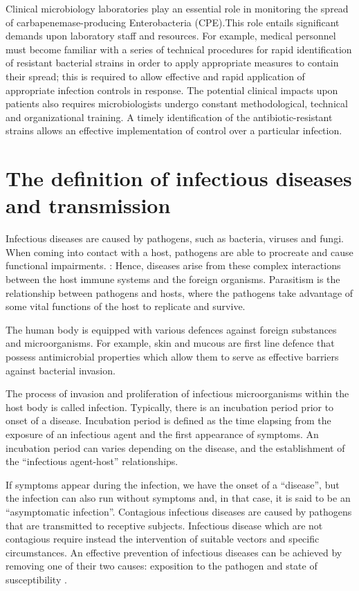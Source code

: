 \documentclass[11pt]{report}
\begin{document}
Clinical microbiology laboratories play an essential role in monitoring the spread of carbapenemase-producing Enterobacteria (CPE).This role entails significant demands upon laboratory staff and resources. For example, medical personnel must become familiar with a series of technical procedures for rapid identification of resistant bacterial strains in order to apply appropriate measures to contain their spread; this is required to allow effective and rapid application of appropriate infection controls in response. The potential clinical impacts upon patients also requires microbiologists undergo constant methodological, technical and organizational training. A timely identification of the antibiotic-resistant strains allows an effective implementation of control over a particular infection.

\section{The definition of infectious diseases and transmission}
Infectious diseases are caused by pathogens, such as bacteria, viruses and fungi. When coming into contact with a host, pathogens are able to procreate and cause functional impairments. :  Hence,  diseases arise from these complex interactions between the host immune systems and the foreign organisms. Parasitism is the relationship between pathogens and hosts, where the pathogens take advantage of some vital functions of the host to replicate and survive. 

The human body is equipped with various defences against foreign substances and microorganisms. For example, skin and mucous are first line defence that possess antimicrobial properties which allow them to serve as effective barriers against bacterial invasion.

The process of invasion and proliferation of infectious microorganisms within the host body is called infection. Typically, there is an incubation period prior to onset of a disease. Incubation period is defined as the time elapsing from the exposure of an infectious agent and the first appearance of symptoms.  An incubation period can varies depending on the disease, and the establishment of the “infectious agent-host” relationships.

If symptoms appear during the infection, we have the onset of a “disease”, but the infection can also run without symptoms and, in that case, it is said to be an “asymptomatic infection”.
Contagious infectious diseases are caused by pathogens that are transmitted to receptive subjects.
Infectious disease which are not contagious require instead the intervention of suitable vectors and specific circumstances.
An effective prevention of infectious diseases can be achieved by removing one of their two causes: exposition to the pathogen and state of susceptibility \cite{EPICentro}.
\end{document}
